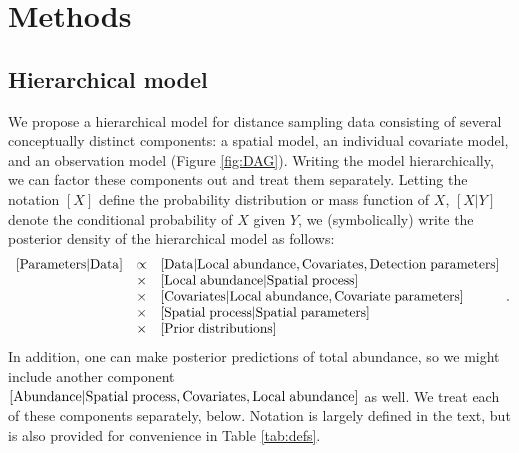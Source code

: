 \documentclass[10pt]{article}
\begin{document}

\section*{Methods}

\subsection*{Hierarchical model}

We propose a hierarchical model for distance sampling data consisting of several conceptually distinct components: a spatial model, an individual covariate model, and an observation model (Figure \ref{fig:DAG}).  Writing the model hierarchically, we can factor these components out
and treat them separately.  Letting the notation $[X]$ define the probability distribution or mass function of $X$, $[X|Y]$ denote the conditional probability of $X$ given $Y$, we (symbolically) write the posterior density of the hierarchical model as follows:
$$
\begin{array}{lll}
[ {\rm Parameters} | {\rm Data}] & \propto & [{\rm Data | Local \hspace{1mm} abundance, Covariates, Detection \hspace{1mm} parameters}]\\
& \times & [{\rm Local \hspace{1mm} abundance | Spatial \hspace{1mm} process}]\\
& \times & [{\rm Covariates|Local \hspace{1mm} abundance, Covariate \hspace{1mm} parameters}]\\
& \times & [{\rm Spatial \hspace{1mm} process | Spatial\hspace{1mm}  parameters}]\\
& \times & [{\rm Prior \hspace{1mm} distributions}]
\end{array}.
$$
In addition, one can make posterior predictions of total abundance, so we might include another component
$[{\rm Abundance |Spatial \hspace{1mm} process,Covariates,Local \hspace{1mm} abundance }]$ as well.
We treat each of these components separately, below.  Notation is largely defined in the text, but is also provided for convenience in Table \ref{tab:defs}.
\end{document}
